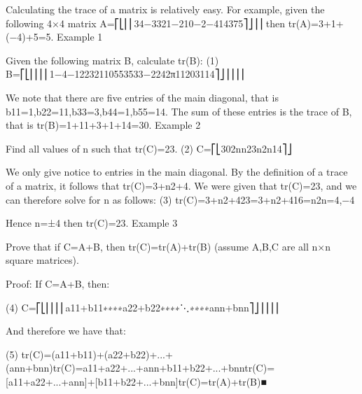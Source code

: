
Calculating the trace of a matrix is relatively easy. For example, given the following 4×4 matrix A=⎡⎣⎢⎢34−3321−210−2−414375⎤⎦⎥⎥ then tr(A)=3+1+(−4)+5=5.
Example 1

Given the following matrix B, calculate tr(B):
(1)
B=⎡⎣⎢⎢⎢⎢1−4−12232110553533−2242π11203114⎤⎦⎥⎥⎥⎥

We note that there are five entries of the main diagonal, that is b11=1,b22=11,b33=3,b44=1,b55=14. The sum of these entries is the trace of B, that is tr(B)=1+11+3+1+14=30.
Example 2

Find all values of n such that tr(C)=23.
(2)
C=⎡⎣302nn23n2n14⎤⎦

We only give notice to entries in the main diagonal. By the definition of a trace of a matrix, it follows that tr(C)=3+n2+4. We were given that tr(C)=23, and we can therefore solve for n as follows:
(3)
tr(C)=3+n2+423=3+n2+416=n2n=4,−4

Hence n=±4 then tr(C)=23.
Example 3

Prove that if C=A+B, then tr(C)=tr(A)+tr(B) (assume A,B,C are all n×n square matrices).

    Proof: If C=A+B, then:

(4)
C=⎡⎣⎢⎢⎢⎢a11+b11∗∗∗∗a22+b22∗∗∗∗⋱∗∗∗∗ann+bnn⎤⎦⎥⎥⎥⎥

    And therefore we have that:

(5)
tr(C)=(a11+b11)+(a22+b22)+...+(ann+bnn)tr(C)=a11+a22+...+ann+b11+b22+...+bnntr(C)=[a11+a22+...+ann]+[b11+b22+...+bnn]tr(C)=tr(A)+tr(B)■